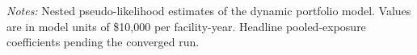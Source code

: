 \documentclass[
  12pt,
]{article}
\begin{document}
\clearpage
\null\vfill
\begin{center}
\label{tbl-struct-estimates}
\vspace{6pt}
\par\vspace{10pt}
\begin{minipage}{0.85\textwidth}\small\textit{Notes:} Nested pseudo-likelihood estimates of the dynamic portfolio model. Values are in model units of \$10,000 per facility-year. Headline pooled-exposure coefficients pending the converged run.\end{minipage}
\end{center}
\vfill\clearpage


  
\end{document}
